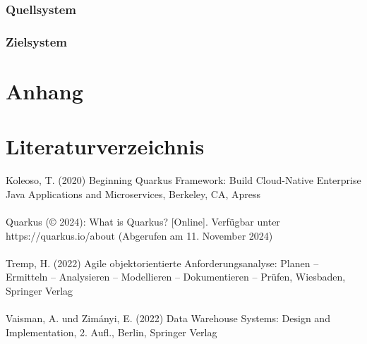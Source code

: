 \documentclass[10pt]{article}
\begin{document}
\subsubsection{Quellsystem}
\subsubsection{Zielsystem}
\subsection{}
\section{Anhang}
\newpage
\section{Literaturverzeichnis}
Koleoso, T. (2020) Beginning Quarkus Framework: Build Cloud-Native Enterprise Java Applications and Microservices, Berkeley, CA, Apress\\\\
Quarkus (© 2024): What is Quarkus? [Online]. Verfügbar unter https://quarkus.io/about (Abgerufen am 11. November 2024)\\\\
Tremp, H. (2022)  Agile objektorientierte Anforderungsanalyse:  Planen – Ermitteln – Analysieren – Modellieren – Dokumentieren – Prüfen, Wiesbaden, Springer Verlag\\\\
Vaisman, A. und Zimányi, E. (2022) Data Warehouse Systems: Design and Implementation, 2. Aufl., Berlin, Springer Verlag\\\\
\end{document}
